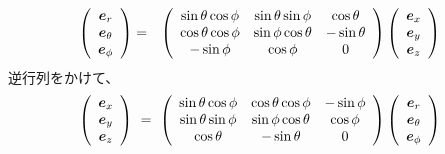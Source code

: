 \documentclass[a4paper,11pt,fleqn]{jarticle}
\def \vec#1{\mbox{\boldmath $#1$}} %
\begin{document}
\begin{eqnarray*}
      \left(
    \begin{array}{c}
      \vec{e}_r \\
      \vec{e}_\theta \\
      \vec{e}_\phi\\
    \end{array}
    \right)
  &=& 
     \left(
    \begin{array}{ccc}
    \sin\theta\cos\phi & \sin\theta\sin\phi & \cos\theta \\
    \cos\theta\cos\phi & \sin\phi\cos\theta & -\sin\theta\\
    -\sin\phi & \cos\phi & 0
    \end{array}
    \right)
        \left(
    \begin{array}{c}
      \vec{e}_x \\
      \vec{e}_y \\
      \vec{e}_z\\
    \end{array}
    \right)
\end{eqnarray*}
逆行列をかけて、
\begin{eqnarray*}
       \left(
    \begin{array}{c}
      \vec{e}_x \\
      \vec{e}_y \\
      \vec{e}_z\\
    \end{array}
    \right)
    ~=~
         \left(
    \begin{array}{ccc}
    \sin\theta\cos\phi &  \cos\theta\cos\phi &-\sin\phi  \\
   \sin\theta\sin\phi & \sin\phi\cos\theta &\cos\phi  \\
    \cos\theta & -\sin\theta& 0
    \end{array}
    \right)
            \left(
    \begin{array}{c}
      \vec{e}_r \\
      \vec{e}_\theta \\
      \vec{e}_\phi\\
    \end{array}
    \right)
\end{eqnarray*}

\newpage
\end{document}
